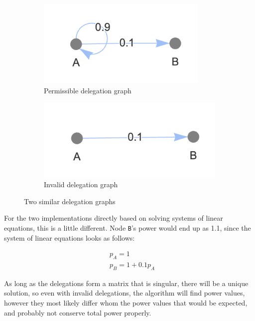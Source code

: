 \begin{figure}[h]
    \centering
    \begin{subfigure}[t]{0.45\textwidth}
	\centering
	\includegraphics[width=0.9\textwidth]{allowed_self_loop}
	\caption{Permissible delegation graph}
	\label{subfig:permissible-self-delegation}
    \end{subfigure}
    \hfill
    \begin{subfigure}[t]{0.45\textwidth}
        \centering
        \includegraphics[width=\textwidth]{invalid_delegation_graph}
        \caption{Invalid delegation graph}
         \label{subfig:invalid-delegation-graph} 
    \end{subfigure}
    \caption{Two similar delegation graphs}
    \label{fig:small-delegation-graphs}
\end{figure}

For the two implementations directly based on solving systems of linear equations, this is a little different. Node \texttt{B}'s power would end up as 1.1, since the system of linear equations looks as follows:

\begin{align*}
& p_A = 1 \\
& p_B = 1 + 0.1p_A
\end{align*}

As long as the delegations form a matrix that is singular, there will be a unique solution, so even with invalid delegations, the algorithm will find power values, however they most likely differ whom the power values that would be expected, and probably not conserve total power properly. 

